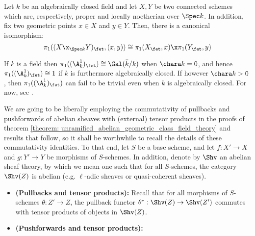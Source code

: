         \begin{proposition}
                \cite[Corollaire 1.7]{SGA1} Let $k$ be an algebraically closed field and let $X, Y$ be two connected schemes which are, respectively, proper and locally noetherian over $\Spec k$. In addition, fix two geometric points $x \in X$ and $y \in Y$. Then, there is a canonical isomorphism:
                    $$\pi_1((X \x_{\Spec k} Y)_{\fet}, (x, y)) \cong \pi_1(X_{\fet}, x) \x \pi_1(Y_{\fet}, y)$$
            \end{proposition}
            
            
            \begin{example} \label{example: etale_fundamental_group_of_the_affine_line}
                If $k$ is a field then $\pi_1((\A^1_k)_{\fet}) \cong \Gal(\bar{k}/k)$ when $\chara k = 0$, and hence $\pi_1((\A^1_k)_{\fet}) \cong 1$ if $k$ is furthermore algebraically closed. If however $\chara k > 0$, then $\pi_1((\A^1_k)_{\fet})$ can fail to be trivial even when $k$ is algebraically closed. For now, see \cite[Theorem 6.13, Remark 6.23, and Exercises 6.28 and 6.29]{lenstra_1985_galois_theory_for_schemes}.
            \end{example}
            
    \begin{remark} \label{remark: pullbacks_pushforwards_and_tensor_products}
            We are going to be liberally employing the commutativity of pullbacks and pushforwards of abelian sheaves with (external) tensor products in the proofs of theorem \ref{theorem: unramified_abelian_geometric_class_field_theory} and results that follow, so it shall be worthwhile to recall the details of these commutativity identities. To that end, let $S$ be a base scheme, and let $f: X' \to X$ and $g: Y' \to Y$ be morphisms of $S$-schemes. In addition, denote by $\Shv$ an abelian sheaf theory, by which we mean one such that for all $S$-schemes, the category $\Shv(Z)$ is abelian (e.g. $\ell$-adic sheaves or quasi-coherent sheaves).
            \begin{itemize}
                \item \textbf{(Pullbacks and tensor products):} Recall that for all morphisms of $S$-schemes $\theta: Z' \to Z$, the pullback functor $\theta^*: \Shv(Z) \to \Shv(Z')$ commutes with tensor products of objects in $\Shv(Z)$. 
                \item \textbf{(Pushforwards and tensor products):}
            \end{itemize}
        \end{remark}
        
